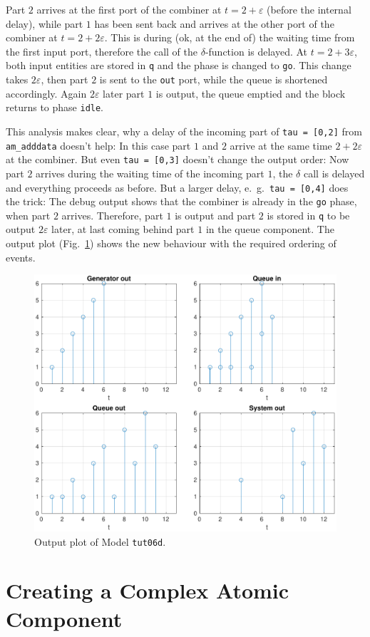 \documentclass[12pt,oneside,a4paper,bibtotoc,BCOR=0pt,DIV=20]{scrreprt}
\newcommand{\cft}[1]{\mbox{\texttt{#1}}}   %
\newcommand{\epsi}{\varepsilon}
\begin{document}
Part $2$ arrives at the first port of the combiner at $t = 2 + \epsi$
(before the internal delay), while part $1$ has been sent back and arrives
at the other port of the combiner at $t = 2 + 2\epsi$. This is during (ok, at
the end of) the waiting time from the first input port, therefore the call of
the $\delta$-function is delayed. At $t = 2 + 3\epsi$, both input entities are
stored in \cft{q} and the phase is changed to \cft{go}. This change takes
$2\epsi$, then part $2$ is sent to the \cft{out} port, while the queue is
shortened accordingly. Again $2\epsi$ later part $1$ is output, the queue
emptied and the block returns to phase \cft{idle}.

This analysis makes clear, why a delay of the incoming part of \cft{tau =
  [0,2]} from \cft{am\_adddata} doesn't help: In this case part $1$ and $2$
arrive at the same time $2 + 2\epsi$ at the combiner. But even \cft{tau =
  [0,3]} doesn't change the output order: Now part $2$ arrives during the
waiting time of the incoming part $1$, the $\delta$ call is delayed and
everything proceeds as before. But a larger delay, e.\ g.\ \cft{tau = [0,4]}
does the trick: The debug output shows that the combiner is already in the
\cft{go} phase, when part $2$ arrives. Therefore, part $1$ is output and part
$2$ is stored in \cft{q} to be output $2\epsi$ later, at last coming behind
part $1$ in the queue component.  The output plot (Fig.\ \ref{fig_18}) shows
the new behaviour with the required ordering of events.

\begin{figure}[ht]
\centering
\includegraphics[width=0.48\columnwidth]{images/bild18.pdf}
\caption{Output plot of Model \cft{tut06d}.}
\label{fig_18}
\end{figure}


\chapter{Creating a Complex Atomic Component} \label{sec9}
\end{document}
